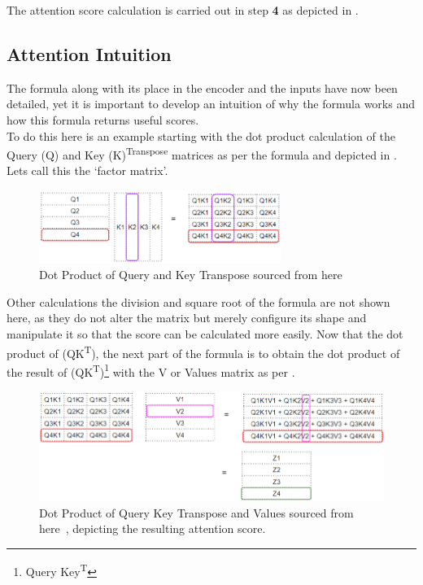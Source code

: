 The attention score calculation is carried out in step \textbf{4} as depicted in . \\
\subsection{Attention Intuition}
The formula along with its place in the encoder and the inputs have now been detailed, yet it is important to develop an intuition of
why the formula works and how this formula returns useful scores.\\
To do this here is an example starting with the dot product calculation of the Query (Q) and Key (K)\textsuperscript{Transpose} matrices
as per the formula and depicted in . Lets call this the `factor matrix'.
\begin{figure}[H]
	\centering
	\includegraphics[width=0.7\textwidth]{figures/dot_prodct_q_kt.png}
	\caption{Dot Product of Query and Key Transpose sourced from here~\autocite{doshiTransformersExplainedVisually2021b}}
	\label{fig:q_kt_dot_product}
\end{figure}
Other calculations the division and square root of the formula are not shown here, as they do not alter the matrix but merely configure its
shape and manipulate it so that the score can be calculated more easily.
\bigbreak
Now that the dot product of (QK\textsuperscript{T}), the next part of the formula is to obtain the
dot product of the result of (QK\textsuperscript{T})\footnote{Query Key\textsuperscript{T}} with the V or Values matrix as per .
\begin{figure}[H]
	\centering
	\includegraphics[width=1\textwidth]{figures/qk_v_dot_product.png}
	\caption{Dot Product of Query Key Transpose and Values sourced from here~\autocite{doshiTransformersExplainedVisually2021b}, depicting the
		resulting attention score.}
	\label{fig:qk_v_dot_product}
\end{figure}

